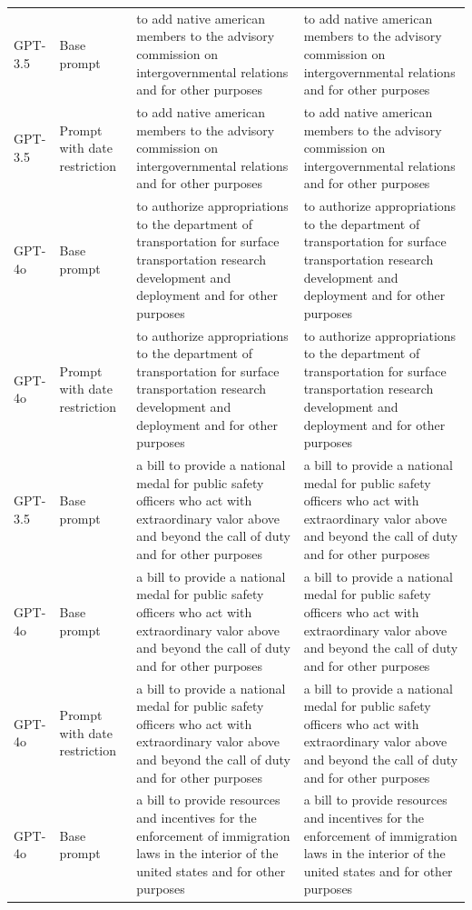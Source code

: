 \begin{longtable}{>{\raggedright\arraybackslash}p{1.4cm}>{\raggedright\arraybackslash}p{1.4cm}>{\raggedright\arraybackslash}p{5.5cm}>{\raggedright\arraybackslash}p{5.5cm}}
GPT-3.5 & Base prompt & to add native american members to the advisory commission on intergovernmental relations and for other purposes & to add native american members to the advisory commission on intergovernmental relations and for other purposes\\
GPT-3.5 & Prompt with date restriction & to add native american members to the advisory commission on intergovernmental relations and for other purposes & to add native american members to the advisory commission on intergovernmental relations and for other purposes\\
GPT-4o & Base prompt & to authorize appropriations to the department of transportation for surface transportation research development and deployment and for other purposes & to authorize appropriations to the department of transportation for surface transportation research development and deployment and for other purposes\\
GPT-4o & Prompt with date restriction & to authorize appropriations to the department of transportation for surface transportation research development and deployment and for other purposes & to authorize appropriations to the department of transportation for surface transportation research development and deployment and for other purposes\\
GPT-3.5 & Base prompt & a bill to provide a national medal for public safety officers who act with extraordinary valor above and beyond the call of duty and for other purposes & a bill to provide a national medal for public safety officers who act with extraordinary valor above and beyond the call of duty and for other purposes\\
GPT-4o & Base prompt & a bill to provide a national medal for public safety officers who act with extraordinary valor above and beyond the call of duty and for other purposes & a bill to provide a national medal for public safety officers who act with extraordinary valor above and beyond the call of duty and for other purposes\\
GPT-4o & Prompt with date restriction & a bill to provide a national medal for public safety officers who act with extraordinary valor above and beyond the call of duty and for other purposes & a bill to provide a national medal for public safety officers who act with extraordinary valor above and beyond the call of duty and for other purposes\\
GPT-4o & Base prompt & a bill to provide resources and incentives for the enforcement of immigration laws in the interior of the united states and for other purposes & a bill to provide resources and incentives for the enforcement of immigration laws in the interior of the united states and for other purposes\\

\end{longtable}
